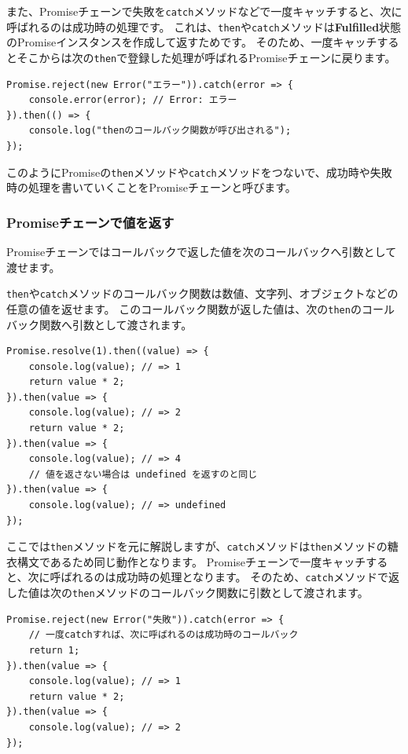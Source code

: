 また、Promiseチェーンで失敗を\texttt{catch}メソッドなどで一度キャッチすると、次に呼ばれるのは成功時の処理です。
これは、\texttt{then}や\texttt{catch}メソッドは\textbf{Fulfilled}状態のPromiseインスタンスを作成して返すためです。
そのため、一度キャッチするとそこからは次の\texttt{then}で登録した処理が呼ばれるPromiseチェーンに戻ります。

\begin{lstlisting}
Promise.reject(new Error("エラー")).catch(error => {
    console.error(error); // Error: エラー
}).then(() => {
    console.log("thenのコールバック関数が呼び出される");
});
\end{lstlisting}

このようにPromiseの\texttt{then}メソッドや\texttt{catch}メソッドをつないで、成功時や失敗時の処理を書いていくことをPromiseチェーンと呼びます。\enlargethispage{\baselineskip}

\hypertarget{promise-chain-value}{%
\subsubsection{Promiseチェーンで値を返す}\label{promise-chain-value}}

Promiseチェーンではコールバックで返した値を次のコールバックへ引数として渡せます。

\texttt{then}や\texttt{catch}メソッドのコールバック関数は数値、文字列、オブジェクトなどの任意の値を返せます。
このコールバック関数が返した値は、次の\texttt{then}のコールバック関数へ引数として渡されます。

\begin{lstlisting}
Promise.resolve(1).then((value) => {
    console.log(value); // => 1
    return value * 2;
}).then(value => {
    console.log(value); // => 2
    return value * 2;
}).then(value => {
    console.log(value); // => 4
    // 値を返さない場合は undefined を返すのと同じ
}).then(value => {
    console.log(value); // => undefined
});
\end{lstlisting}
\newpage
ここでは\texttt{then}メソッドを元に解説しますが、\texttt{catch}メソッドは\texttt{then}メソッドの糖衣構文であるため同じ動作となります。
Promiseチェーンで一度キャッチすると、次に呼ばれるのは成功時の処理となります。
そのため、\texttt{catch}メソッドで返した値は次の\texttt{then}メソッドのコールバック関数に引数として渡されます。

\begin{lstlisting}
Promise.reject(new Error("失敗")).catch(error => { 
    // 一度catchすれば、次に呼ばれるのは成功時のコールバック
    return 1;
}).then(value => {
    console.log(value); // => 1
    return value * 2;
}).then(value => {
    console.log(value); // => 2
});
\end{lstlisting}

